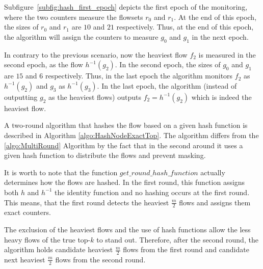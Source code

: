 Subfigure~\ref{subfig:hash_first_epoch} depicts the first epoch of the monitoring, where the two counters measure the flowsets $r_0$ and $r_1$. At the end of this epoch, the sizes of $r_0$ and $r_1$ are $10$ and $21$ respectively. Thus, at the end of this epoch, the algorithm will assign the counters to measure $g_0$ and $g_1$ in the next epoch.

In contrary to the previous scenario, now the heaviest flow $f_2$ is measured in the second epoch, as the flow $h^{-1}(g_2)$. In the second epoch, the sizes of $g_0$ and $g_1$ are $15$ and $6$ respectively. Thus, in the last epoch the algorithm monitors $f_2$ as $h^{-1}(g_2)$ and $g_3$ as $h^{-1}(g_3)$. In the last epoch, the algorithm (instead of outputting $g_2$ as the heaviest flows) outputs $f_2=h^{-1}(g_2)$ which is indeed the heaviest flow.

A two-round algorithm that hashes the flow based on a given hash function is described in Algorithm \ref{algo:HashNodeExactTop}. The algorithm differs from the \ref{algo:MultiRound} Algorithm by the fact that in the second around it uses a given hash function to distribute the flows and prevent masking.

It is worth to note that the function $get\_round\_hash\_function$ actually determines how the flows are hashed. In the first round, this function assigns both $h$ and $h^{-1}$ the identity function and no hashing occurs at the first round. This means, that the first round detects the heaviest $\frac{m}{2}$ flows and assigns them exact counters.

The exclusion of the heaviest flows and the use of hash functions allow the less heavy flows of the true top-$k$ to stand out. Therefore, after the second round, the algorithm holds candidate heaviest $\frac{m}{2}$ flows from the first round and candidate next heaviest $\frac{m}{2}$ flows from the second round.

